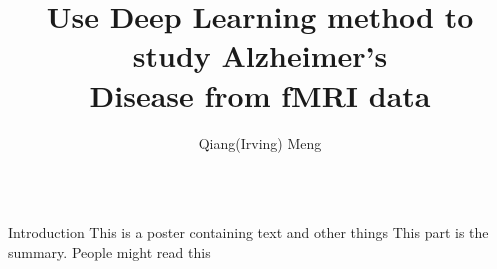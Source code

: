 \documentclass[serif,mathserif,final]{beamer}
\title{Use Deep Learning method to study Alzheimer's \\Disease from fMRI data}
\author{Qiang(Irving) Meng}
\institute{Industrial \& Systems Engineering}
\begin{document}
\begin{frame}{}
  \begin{columns}[t]
    \begin{column}{0.32\linewidth}


      \begin{block}{Introduction}
        This is a poster containing text and other things
        This part is the summary.  People might read this
      \end{block}

    \end{column}
  \end{columns}
\end{frame}
\end{document}
